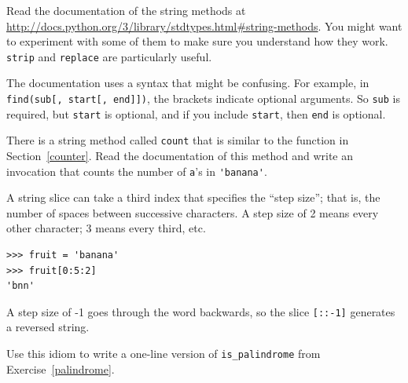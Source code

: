\documentclass[10pt]{book}
\begin{document}
\begin{exercise}

Read the documentation of the string methods at
\url{http://docs.python.org/3/library/stdtypes.html#string-methods}.
You might want to experiment with some of them to make sure you
understand how they work.  {\tt strip} and {\tt replace} are
particularly useful.

The documentation uses a syntax that might be confusing.
For example, in \verb"find(sub[, start[, end]])", the brackets
indicate optional arguments.  So {\tt sub} is required, but
{\tt start} is optional, and if you include {\tt start},
then {\tt end} is optional.

\end{exercise}


\begin{exercise}

There is a string method called {\tt count} that is similar
to the function in Section~\ref{counter}.  Read the documentation
of this method
and write an invocation that counts the number of {\tt a}'s
in \verb"'banana'".
\end{exercise}


\begin{exercise}

A string slice can take a third index that specifies the ``step
size''; that is, the number of spaces between successive characters.
A step size of 2 means every other character; 3 means every third,
etc.

\begin{verbatim}
>>> fruit = 'banana'
>>> fruit[0:5:2]
'bnn'
\end{verbatim}

A step size of -1 goes through the word backwards, so
the slice \verb"[::-1]" generates a reversed string.

Use this idiom to write a one-line version of \verb"is_palindrome"
from Exercise~\ref{palindrome}.
\end{exercise}
\end{document}
